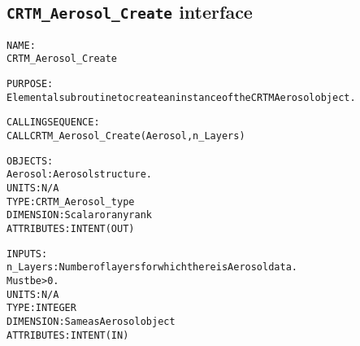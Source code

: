 \subsection{\texttt{CRTM\_Aerosol\_Create} interface}
  \label{sec:CRTM_Aerosol_Create_interface}
  \begin{alltt}
 
  NAME:
        CRTM_Aerosol_Create
  
  PURPOSE:
        Elemental subroutine to create an instance of the CRTM Aerosol object.
 
  CALLING SEQUENCE:
        CALL CRTM_Aerosol_Create( Aerosol, n_Layers )
 
  OBJECTS:
        Aerosol:      Aerosol structure.
                      UNITS:      N/A
                      TYPE:       CRTM_Aerosol_type
                      DIMENSION:  Scalar or any rank
                      ATTRIBUTES: INTENT(OUT)
 
  INPUTS:
        n_Layers:     Number of layers for which there is Aerosol data.
                      Must be > 0.
                      UNITS:      N/A
                      TYPE:       INTEGER
                      DIMENSION:  Same as Aerosol object
                      ATTRIBUTES: INTENT(IN)
 
  \end{alltt}
